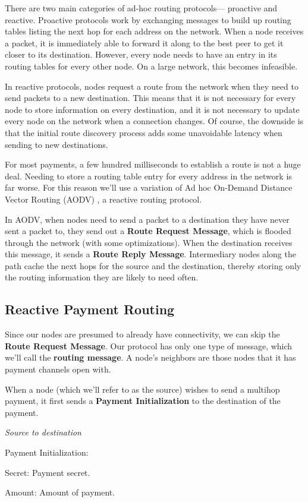 \documentclass[a4paper]{article}
\newcommand{\bgls}[1]{\textbf{\gls{#1}}}
\newenvironment{mydescription}
{\begin{description}
\setlength{\itemsep}{5pt}
  \setlength{\parskip}{0pt}
  \setlength{\labelsep}{5pt}
}{
\end{description}}
\begin{document}
There are two main categories of ad-hoc routing protocols--- proactive and reactive. Proactive protocols work by exchanging messages to build up routing tables listing the next hop for each address on the network. When a node receives a packet, it is immediately able to forward it along to the best peer to get it closer to its destination. However, every node needs to have an entry in its routing tables for every other node. On a large network, this becomes infeasible.

In reactive protocols, nodes request a route from the network when they need to send packets to a new destination. This means that it is not necessary for every node to store information on every destination, and it is not necessary to update every node on the network when a connection changes. Of course, the downside is that the initial route discovery process adds some unavoidable latency when sending to new destinations.

For most payments, a few hundred milliseconds to establish a route is not a huge deal. Needing to store a routing table entry for every address in the network is far worse. For this reason we'll use a variation of Ad hoc On-Demand Distance Vector Routing (AODV) \cite{aodv}, a reactive routing protocol.

In AODV, when nodes need to send a packet to a destination they have never sent a packet to, they send out a \textbf{Route Request Message}, which is flooded through the network (with some optimizations). When the destination receives this message, it sends a \textbf{Route Reply Message}. Intermediary nodes along the path cache the next hops for the source and the destination, thereby storing only the routing information they are likely to need often.

\subsection{Reactive Payment Routing}

Since our nodes are presumed to already have connectivity, we can skip the \textbf{Route Request Message}. Our protocol has only one type of message, which we'll call the \bgls{routing message}. A node's neighbors are those nodes that it has payment channels open with.

When a node (which we'll refer to as the source) wishes to send a multihop payment, it first sends a \textbf{Payment Initialization} to the destination of the payment.

\begin{mdframed}[style=message]{\emph{Source to destination}}
\begin{mydescription}
\item[Payment Initialization:] \hfill
\begin{mydescription}
  \item[Secret:] Payment secret.
  \item[Amount:] Amount of payment.
\end{mydescription}
\end{mydescription}
\end{mdframed}
\end{document}
